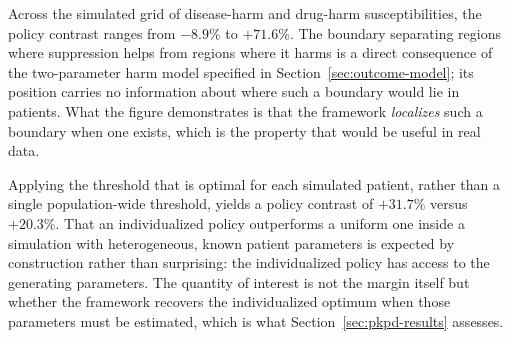 Across the simulated grid of disease-harm and drug-harm susceptibilities, the policy contrast ranges from $-8.9\%$ to $+71.6\%$. The boundary separating regions where suppression helps from regions where it harms is a direct consequence of the two-parameter harm model specified in Section~\ref{sec:outcome-model}; its position carries no information about where such a boundary would lie in patients. What the figure demonstrates is that the framework \emph{localizes} such a boundary when one exists, which is the property that would be useful in real data.

Applying the threshold that is optimal for each simulated patient, rather than a single population-wide threshold, yields a policy contrast of $+31.7\%$ versus $+20.3\%$. That an individualized policy outperforms a uniform one inside a simulation with heterogeneous, known patient parameters is expected by construction rather than surprising: the individualized policy has access to the generating parameters. The quantity of interest is not the margin itself but whether the framework recovers the individualized optimum when those parameters must be estimated, which is what Section~\ref{sec:pkpd-results} assesses.

